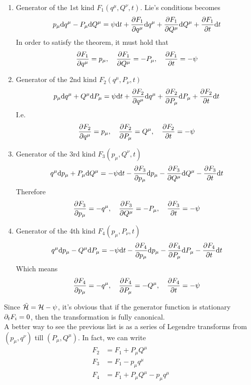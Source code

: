 \documentclass[../admech.tex]{subfiles}
\begin{document}
\begin{enumerate}
\item Generator of the 1st kind $F_1(q^\mu,Q^\nu,t)$. Lie's conditions becomes
	\begin{equation}
		p_\mu\dd q^\mu-P_\mu\dd Q^\mu=\psi\dd t+\pdv{F_1}{q^\mu}\dd q^\mu+\pdv{F_1}{Q^\mu}\dd Q^\mu+\pdv{F_1}{t}\dd t
		\label{eq:1lie}
	\end{equation}
	In order to satisfy the theorem, it must hold that
	\begin{equation}
		\pdv{F_1}{q^\mu}=p_\mu,\quad\pdv{F_1}{Q^\mu}=-P_\mu,\quad\pdv{F_1}{t}=-\psi
		\label{eq:gender1}
	\end{equation}
\item Generator of the 2nd kind $F_2(q^\mu,P_\nu,t)$
	\begin{equation}
		p_\mu\dd q^\mu+Q^\mu\dd P_\mu=\psi\dd t+\pdv{F_2}{q^\mu}\dd q^\mu+\pdv{F_2}{P_\mu}\dd P_\mu+\pdv{F_2}{t}\dd t
		\label{eq:lie2}
	\end{equation}
	I.e.
	\begin{equation}
		\pdv{F_2}{q^\mu}=p_\mu,\quad\pdv{F_2}{P_\mu}=Q^\mu,\quad\pdv{F_2}{t}=-\psi
		\label{eq:gender2}
	\end{equation}
\item Generator of the 3rd kind $F_3(p_\mu,Q^\nu,t)$
	\begin{equation}
		q^\mu\dd p_\mu+P_\mu\dd Q^\mu=-\psi\dd t-\pdv{F_3}{p_\mu}\dd p_\mu-\pdv{F_3}{Q^\mu}\dd Q^\mu-\pdv{F_3}{t}\dd t
		\label{eq:lie3}
	\end{equation}
	Therefore
	\begin{equation}
		\pdv{F_3}{p_\mu}=-q^\mu,\quad\pdv{F_3}{Q^\mu}=-P_\mu,\quad\pdv{F_3}{t}=-\psi
		\label{eq:gender3}
	\end{equation}
\item Generator of the 4th kind $F_4(p_\mu,P_\nu,t)$
	\begin{equation}
		q^\mu\dd p_\mu-Q^\mu\dd P_\mu=-\psi\dd t-\pdv{F_4}{p_\mu}\dd p_\mu-\pdv{F_4}{P_\mu}\dd P_\mu-\pdv{F_4}{t}\dd t
		\label{eq:lie4}
	\end{equation}
	Which means
	\begin{equation}
		\pdv{F_4}{p_\mu}=-q^\mu,\quad\pdv{F_4}{P_\mu}=-Q^\mu,\quad\pdv{F_4}{t}=-\psi
		\label{eq:gender4}
	\end{equation}
\end{enumerate}
Since $\tilde{\mathcal{H}}=\mathcal{H}-\psi$, it's obvious that if the generator function is stationary $\partial_tF_i=0$, then the transformation is fully canonical.\\
A better way to see the previous list is as a series of Legendre transforms from $(p_\mu,q^\nu)$ till $(P_\mu,Q^\mu)$. In fact, we can write
\begin{equation}
	\begin{aligned}
		F_2&=F_1+P_\mu Q^\mu\\
		F_3&=F_1-p_\mu q^\mu\\
		F_4&=F_1+P_\mu Q^\mu-p_\mu q^\mu
	\end{aligned}
	\label{eq:genfunleg}
\end{equation}
\end{document}
